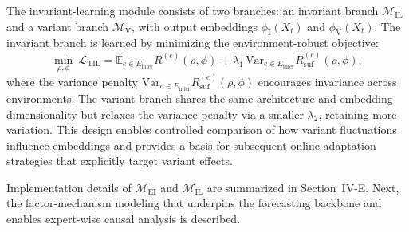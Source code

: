 ﻿\documentclass[journal]{IEEEtran}
\newenvironment{auditproblemblock}{\begingroup\color{red}}{\endgroup}
\begin{document}
The invariant-learning module consists of two branches: an invariant branch $\mathcal{M}_{\mathrm{IL}}$ and a variant branch $\mathcal{M}_{\mathrm{V}}$, with output embeddings $\phi_{\mathrm{I}}(X_t)$ and $\phi_{\mathrm{V}}(X_t)$. The invariant branch is learned by minimizing the environment-robust objective:
\begin{equation}
\min_{\rho,\phi}\ \mathcal{L}_{\mathrm{TIL}}
=\mathbb{E}_{e\in E_{\mathrm{infer}}}R^{(e)}(\rho,\phi)
\,+\lambda_1\,\mathrm{Var}_{e\in E_{\mathrm{infer}}} R_{\mathrm{suf}}^{(e)}(\rho,\phi),
\end{equation}
\begin{auditproblemblock}
where the variance penalty $\mathrm{Var}_{e\in E_{\mathrm{infer}}} R_{\mathrm{suf}}^{(e)}(\rho,\phi)$ encourages invariance across environments. The variant branch shares the same architecture and embedding dimensionality but relaxes the variance penalty via a smaller $\lambda_2$, retaining more variation. This design enables controlled comparison of how variant fluctuations influence embeddings and provides a basis for subsequent online adaptation strategies that explicitly target variant effects. 

Implementation details of $\mathcal{M}_{\mathrm{EI}}$ and $\mathcal{M}_{\mathrm{IL}}$ are summarized in Section~IV-E. Next, the factor-mechanism modeling that underpins the forecasting backbone and enables expert-wise causal analysis is described.
\end{auditproblemblock}
\end{document}
